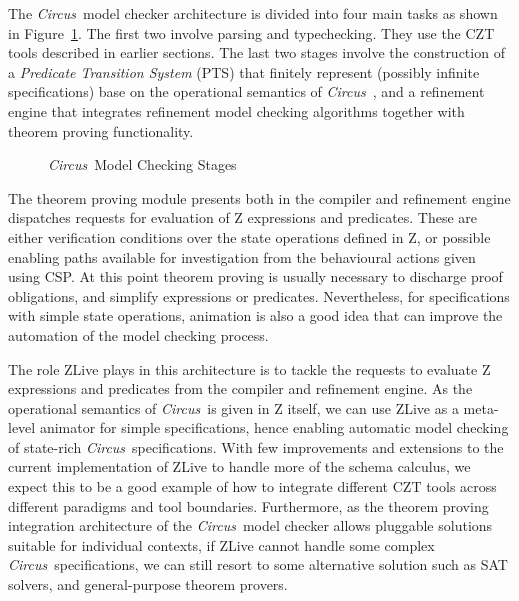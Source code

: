 \documentclass{llncs}
\newcommand{\Circus}{{\sf\slshape Circus}}
\begin{document}
    The \Circus\ model checker architecture is divided into four main
    tasks as shown in Figure~\ref{mc-stages}.  The first two involve
    parsing and typechecking. They use the CZT tools described in
    earlier sections. The last two stages involve the construction of
    a \textit{Predicate Transition System} (PTS) that finitely
    represent (possibly infinite specifications) base on the
    operational semantics of \Circus~\cite{circus.mc:opsem}, and a
    refinement engine that integrates refinement model checking
    algorithms together with theorem proving functionality.  %
    \begin{figure}[t] \begin{center}  \end{center} \caption{\Circus\ Model
    Checking Stages}\label{mc-stages} \end{figure} The theorem
    proving module presents both in the compiler and refinement engine
    dispatches requests for evaluation of Z expressions and predicates.
    These are either verification conditions over the state operations
    defined in Z, or possible enabling paths available for investigation
    from the behavioural actions given using CSP.  At this point theorem
    proving is usually necessary to discharge proof obligations, and
    simplify expressions or predicates. Nevertheless, for
    specifications with simple state operations, animation is also a
    good idea that can improve the automation of the model checking
    process.

    The role ZLive plays in this architecture is to tackle the
    requests to evaluate Z expressions and predicates from the
    compiler and refinement engine.  As the operational semantics of
    \Circus\ is given in Z itself, we can use ZLive as a meta-level
    animator for simple specifications, hence enabling automatic model
    checking of state-rich \Circus\ specifications.  With few
    improvements and extensions to the current implementation of ZLive
    to handle more of the schema calculus, we expect this to be a good
    example of how to integrate different CZT tools across different
    paradigms and tool boundaries. Furthermore, as the theorem proving
    integration architecture of the \Circus\ model checker allows
    pluggable solutions suitable for individual contexts, if ZLive
    cannot handle some complex \Circus\ specifications, we can still
    resort to some alternative solution such as SAT solvers, and
    general-purpose theorem provers.
\end{document}
